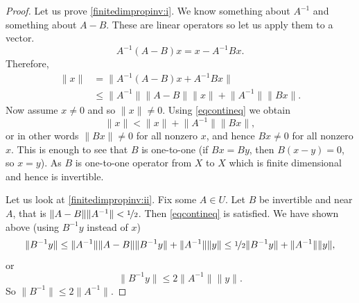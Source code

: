\documentclass[12pt]{book}
\newcommand{\snorm}[1]{\lVert {#1} \rVert}
\theoremstyle{plain}
\theoremstyle{remark}
\theoremstyle{definition}
\theoremstyle{exercise}
\theoremstyle{example}
\begin{document}
\begin{proof}
Let us prove \ref{finitedimpropinv:i}.   We know something about $A^{-1}$
and something about $A-B$.  These are linear operators so let us
apply them to a vector.
\begin{equation*}
A^{-1}(A-B)x
=
x-A^{-1}Bx .
\end{equation*}
Therefore,
\begin{equation*}
\begin{split}
\snorm{x} 
& =
\snorm{A^{-1} (A-B)x + A^{-1}Bx}
\\
& \leq
\snorm{A^{-1}}\snorm{A-B} \snorm{x} + \snorm{A^{-1}}\snorm{Bx} .
\end{split}
\end{equation*}
Now assume $x \neq 0$ and so $\snorm{x} \neq 0$.
Using \eqref{eqcontineq} we obtain
\begin{equation*}
\snorm{x} < \snorm{x} + \snorm{A^{-1}}\snorm{Bx} ,
\end{equation*}
or in other words $\snorm{Bx} \not= 0$ for all nonzero $x$, and hence
$Bx \not= 0$ for all nonzero $x$.  This is enough to see that
$B$ is one-to-one (if $Bx = By$, then $B(x-y) = 0$, so $x=y$).
As $B$ is one-to-one operator from $X$ to $X$ which is finite dimensional
and hence is invertible.

Let us look at \ref{finitedimpropinv:ii}.  Fix some $A \in U$.  Let $B$ be invertible and near $A$,
that is $\snorm{A-B} \snorm{A^{-1}} <  \nicefrac{1}{2}$.
Then \eqref{eqcontineq} is satisfied.
We have shown above (using $B^{-1}y$ instead of $x$)
\begin{equation*}
\snorm{B^{-1}y} \leq 
\snorm{A^{-1}}\snorm{A-B} \snorm{B^{-1}y} + \snorm{A^{-1}}\snorm{y}
\leq
\nicefrac{1}{2} \snorm{B^{-1}y} + \snorm{A^{-1}}\snorm{y} ,
\end{equation*}
or
\begin{equation*}
\snorm{B^{-1}y} \leq 
2\snorm{A^{-1}}\snorm{y} .
\end{equation*}
So
$
\snorm{B^{-1}} \leq 2 \snorm{A^{-1}}
$.


\end{proof}
\end{document}
